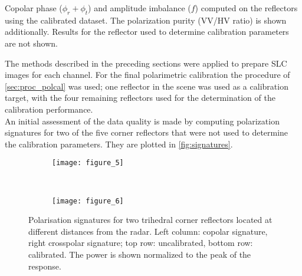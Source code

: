 								
\begin{table}[h]
	\centering
	\caption{Copolar phase ($\phi_r + \phi_t$) and amplitude imbalance ($f$) computed on the reflectors using the calibrated dataset. The polarization purity (VV/HV ratio) is shown additionally. Results for the reflector used to determine calibration parameters are not shown.}
	\label{tab:polcal}
\end{table}		
The methods described in the preceding sections were applied to prepare SLC images for each channel. For the final polarimetric calibration the procedure of \autoref{sec:proc_polcal} was used; one reflector in the scene was used as a calibration target, with the four remaining reflectors used for the determination of the calibration performance.\\
An initial assessment of the data quality is made  by computing polarization signatures\cite{VanZyl1987} for two of the five corner reflectors that were not used to determine the calibration parameters. They are plotted in \autoref{fig:signatures}.
\begin{figure*}[hb]
	\centering
	\begin{subfigure}[t]{\textwidth}
	\centering
	\texttt{[image: figure\_5]}
	\label{fig:signatures:near}
	\end{subfigure}\\
	\begin{subfigure}[t]{\textwidth}
	\centering
	\texttt{[image: figure\_6]}
	\label{fig:signatures:far}
	\end{subfigure}
	\caption{Polarisation signatures for two trihedral corner reflectors located at different distances from the radar. Left column: copolar signature, right crosspolar signature; top row: uncalibrated, bottom row: calibrated. The power is shown normalized to the peak of the response.}
	\label{fig:signatures}
\end{figure*}

